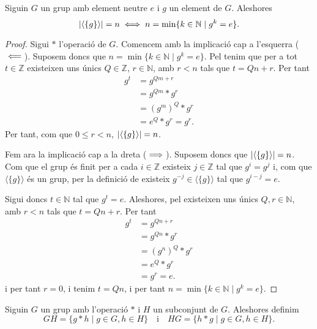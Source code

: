 \documentclass[../Apunts.tex]{subfiles}
\begin{document}
	\begin{proposition}
		\label{prop:potencia element neutre en un grup}
		Siguin \(G\) un grup amb element neutre \(e\) i \(g\) un element de \(G\). Aleshores
		\[\abs{\langle\{g\}\rangle}=n\sii n=\min\{k\in\mathbb{N}\mid g^{k}=e\}.\]
		\begin{proof}
			Sigui \(\ast\) l'operació de \(G\). Comencem amb la implicació cap a l'esquerra (\(\impliedby\)). Suposem doncs que \(n=\min\{k\in\mathbb{N}\mid g^{k}=e\}\). Pel  tenim que per a tot \(t\in\mathbb{Z}\) existeixen uns únics \(Q\in\mathbb{Z}\), \(r\in\mathbb{N}\), amb \(r<n\) tals que \(t=Qn+r\). Per tant
			\begin{align*}
			g^{t}&=g^{Qm+r}\\
			&=g^{Qm}\ast g^{r}\\
			&=(g^{m})^{Q}\ast g^{r}\\
			&=e^{Q}\ast g^{r}=g^{r}.
			\end{align*}
			Per tant, com que \(0\leq r<n\), \(\abs{\langle\{g\}\rangle}=n\).
			
			Fem ara la implicació cap a la dreta (\(\implies\)). Suposem doncs que \(\abs{\langle\{g\}\rangle}=n\). Com que el grup és finit per a cada \(i\in\mathbb{Z}\) existeix \(j\in\mathbb{Z}\) tal que \(g^{i}=g^{j}\) i, com que \(\langle\{g\}\rangle\) és un grup, per la definició de  existeix \(g^{-j}\in\langle\{g\}\rangle\) tal que \(g^{i-j}=e\).
			
			Sigui doncs \(t\in\mathbb{N}\) tal que \(g^{t}=e\). Aleshores, pel  existeixen uns únics \(Q,r\in\mathbb{N}\), amb \(r<n\) tals que \(t=Qn+r\). Per tant
			\begin{align*}
			g^{t}&=g^{Qn+r}\\
			&=g^{Qn}\ast g^{r}\\
			&=(g^{n})^{Q}\ast g^{r}\\
			&=e^{Q}\ast g^{r}\\
			&=g^{r}=e.
			\end{align*}
			i per tant \(r=0\), i tenim \(t=Qn\), i per tant \(n=\min\{k\in\mathbb{N}\mid g^{k}=e\}\).
		\end{proof}
	\end{proposition}
	\begin{definition}
		\label{def:conjugació entre conjunts sobre grups}
		Siguin \(G\) un grup amb l'operació \(\ast\) i \(H\) un subconjunt de \(G\). Aleshores definim
		\[GH=\{g\ast h\mid g\in G,h\in H\}\quad\text{i}\quad HG=\{h\ast g\mid g\in G,h\in H\}.\]
	\end{definition}
\end{document}
